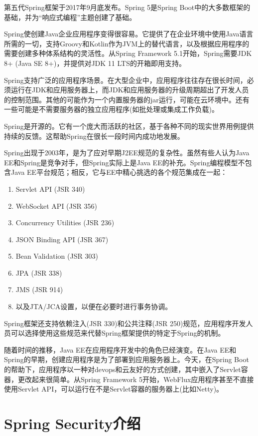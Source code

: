 第五代Spring框架于2017年9月底发布。Spring 5是Spring Boot中的大多数框架的基础，并为“响应式编程”主题创建了基础。

Spring使创建Java企业应用程序变得很容易。它提供了在企业环境中使用Java语言所需的一切，支持Groovy和Kotlin作为JVM上的替代语言，以及根据应用程序的需要创建多种体系结构的灵活性。从Spring Framework 5.1开始，Spring需要JDK 8+ (Java SE 8+)，并提供对JDK 11 LTS的开箱即用支持。

Spring支持广泛的应用程序场景。在大型企业中，应用程序往往存在很长时间，必须运行在JDK和应用服务器上，而JDK和应用服务器的升级周期超出了开发人员的控制范围。其他的可能作为一个内置服务器的jar运行，可能在云环境中。还有一些可能是不需要服务器的独立应用程序(如批处理或集成工作负载)。

Spring是开源的。它有一个庞大而活跃的社区，基于各种不同的现实世界用例提供持续的反馈。这帮助Spring在很长一段时间内成功地发展。

Spring出现于2003年，是为了应对早期J2EE规范的复杂性。虽然有些人认为Java EE和Spring是竞争对手，但Spring实际上是Java EE的补充。Spring编程模型不包含Java EE平台规范；相反，它与EE中精心挑选的各个规范集成在一起：

\begin{enumerate}
  \item Servlet API (JSR 340)
  \item WebSocket API (JSR 356)
  \item Concurrency Utilities (JSR 236)
  \item JSON Binding API (JSR 367)
  \item Bean Validation (JSR 303)
  \item JPA (JSR 338)
  \item JMS (JSR 914)
  \item 以及JTA/JCA设置，以便在必要时进行事务协调。
\end{enumerate}

Spring框架还支持依赖注入(JSR 330)和公共注释(JSR 250)规范，应用程序开发人员可以选择使用这些规范来代替Spring框架提供的特定于Spring的机制。

随着时间的推移，Java EE在应用程序开发中的角色已经演变。在Java EE和Spring的早期，创建应用程序是为了部署到应用服务器上。今天，在Spring Boot的帮助下，应用程序以一种对devops和云友好的方式创建，其中嵌入了Servlet容器，更改起来很简单。从Spring Framework 5开始，WebFlux应用程序甚至不直接使用Servlet API，可以运行在不是Servlet容器的服务器上(比如Netty)。


\section{Spring Security介绍}


